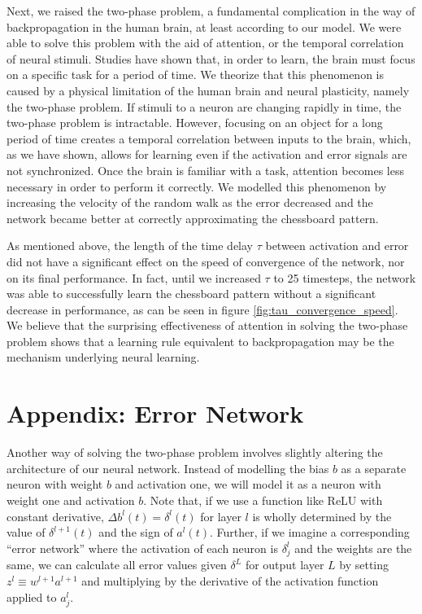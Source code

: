 \documentclass[12pt]{article}
\begin{document}
Next, we raised the two-phase problem, a fundamental complication in the way of backpropagation in the human brain, at least according to our model. We were able to solve this problem with the aid of attention, or the temporal correlation of neural stimuli. Studies have shown that, in order to learn, the brain must focus on a specific task for a period of time. \cite{Desimone2014} We theorize that this phenomenon is caused by a physical limitation of the human brain and neural plasticity, namely the two-phase problem. If stimuli to a neuron are changing rapidly in time, the two-phase problem is intractable. However, focusing on an object for a long period of time creates a temporal correlation between inputs to the brain, which, as we have shown, allows for learning even if the activation and error signals are not synchronized. Once the brain is familiar with a task, attention becomes less necessary in order to perform it correctly. We modelled this phenomenon by increasing the velocity of the random walk as the error decreased and the network became better at correctly approximating the chessboard pattern.

As mentioned above, the length of the time delay $\tau$ between activation and error did not have a significant effect on the speed of convergence of the network, nor on its final performance. In fact, until we increased $\tau$ to 25 timesteps, the network was able to successfully learn the chessboard pattern without a significant decrease in performance, as can be seen in figure \ref{fig:tau_convergence_speed}. We believe that the surprising effectiveness of attention in solving the two-phase problem shows that a learning rule equivalent to backpropagation may be the mechanism underlying neural learning.

\section{Appendix: Error Network}
Another way of solving the two-phase problem involves slightly altering the architecture of our neural network. Instead of modelling the bias $b$ as a separate neuron with weight $b$ and activation one, we will model it as a neuron with weight one and activation $b$. Note that, if we use a function like ReLU with constant derivative, $\Delta b^l(t) = \delta^l(t)$ for layer $l$ is wholly determined by the value of $\delta^{l+1}(t)$ and the sign of $a^l(t)$. Further, if we imagine a corresponding ``error network'' where the activation of each neuron is $\delta^l_j$ and the weights are the same, we can calculate all error values given $\delta^L$ for output layer $L$ by setting $z^l \equiv w^{l+1} a^{l+1}$ and multiplying by the derivative of the activation function applied to $a_j^l$.
 
\end{document}
